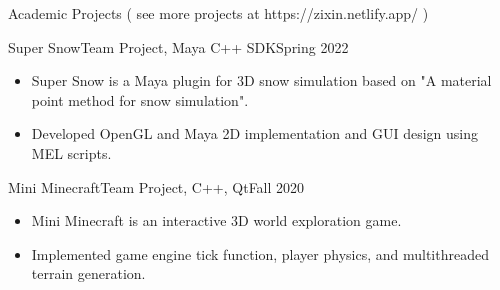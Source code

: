 \documentclass[]{mcdowellcv}
\begin{document}
	\begin{cvsection}{Academic Projects ( see more projects at https://zixin.netlify.app/ )}
		\begin{cvsubsection}{Super Snow}{Team Project, Maya C++ SDK}{Spring 2022}	
			\begin{itemize}
				\item Super Snow is a Maya plugin for 3D snow simulation based on "A material point method for snow simulation".
				\item Developed OpenGL and Maya 2D implementation and GUI design using MEL scripts. 
			\end{itemize}
		\end{cvsubsection}

		\begin{cvsubsection}{Mini Minecraft}{Team Project, C++, Qt}{Fall 2020}	
			\begin{itemize}
				\item Mini Minecraft is an interactive 3D world exploration game.
				\item Implemented game engine tick function, player physics, and multithreaded terrain generation.
			\end{itemize}
		\end{cvsubsection}
	\end{cvsection}
\end{document}
